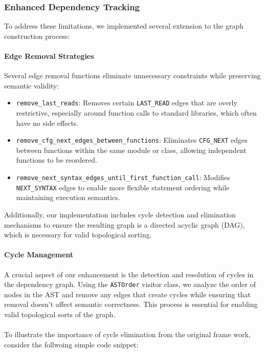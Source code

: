 \documentclass[%
thesis=student,%
coverpage=false,%
titlepage=false,%
headmarks=true, %
english,%
font=libertine, %
math=newpxtx, %
BCOR=5mm,%
coverBCOR=11mm%
]{tum-templates/book/tumbook}
\begin{document}
\subsubsection{Enhanced Dependency Tracking}

To address these limitations, we implemented several extension to the graph construction process:

\paragraph{Edge Removal Strategies}
Several edge removal functions eliminate unnecessary constraints while preserving semantic validity:

\begin{itemize}
    \item \texttt{remove\_last\_reads}: Removes certain \texttt{LAST\_READ} edges that are overly restrictive, especially around function calls to standard libraries, which often have no side effects.
    \item \texttt{remove\_cfg\_next\_edges\_between\_functions}: Eliminates \texttt{CFG\_NEXT} edges between functions within the same module or class, allowing independent functions to be reordered.
    \item \texttt{remove\_next\_syntax\_edges\_until\_first\_function\_call}: Modifies \texttt{NEXT\_SYNTAX} edges to enable more flexible statement ordering while maintaining execution semantics.
\end{itemize}

Additionally, our implementation includes cycle detection and elimination mechanisms to ensure the resulting graph is a directed acyclic graph (DAG), which is necessary for valid topological sorting.

\paragraph{Cycle Management}
A crucial aspect of our enhancement is the detection and resolution of cycles in the dependency graph. Using the \texttt{ASTOrder} visitor class, we analyze the order of nodes in the AST and remove any edges that create cycles while ensuring that removal doesn't affect semantic correctness. This process is essential for enabling valid topological sorts of the graph. \\ \\

To illustrate the importance of cycle elimination from the original frame work, consider the follwoing simple code snippet:
\end{document}
